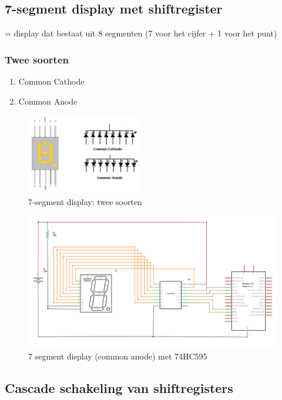 \documentclass{article}
\begin{document}
\subsection{7-segment display met shiftregister}
= display dat bestaat uit 8 segmenten (7 voor het cijfer + 1 voor het punt)

\subsubsection{Twee soorten}
\begin{enumerate}
    \item Common Cathode
    \item Common Anode
\end{enumerate}

\begin{figure}[H]
    \centering
    \includegraphics[width=0.45\textwidth]{7-display.png}
    \caption{7-segment display: twee soorten}
\end{figure}

\begin{figure}[H]
    \centering
    \includegraphics[width=\textwidth]{shiftregister-7-segment.png}
    \caption{7 segment display (common anode) met 74HC595}
\end{figure}

\subsection{Cascade schakeling van shiftregisters}
\end{document}
